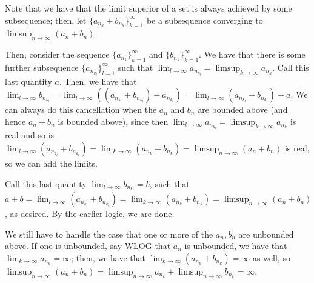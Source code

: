 \documentclass[12pt,letterpaper]{article}
\theoremstyle{definition}
\begin{document}
Note that we have that the limit superior of a set is always achieved by some subsequence; then, let $\{a_{n_{k}} + b_{n_{k}}\}_{k=1}^{\infty}$ be a subsequence converging to $\limsup_{n \rightarrow \infty}(a_{n} + b_{n})$.

Then, consider the sequence $\{a_{n_{k}}\}_{k=1}^{\infty}$ and $\{b_{n_{k}}\}_{k=1}^{\infty}$. We have that there is some further subsequence $\{a_{n_{k_{l}}}\}_{l=1}^{\infty}$ such that $\lim_{l \rightarrow \infty}a_{n_{k_{l}}} = \limsup_{k \rightarrow \infty}a_{n_{k}}$. Call this last quantity $a$. Then, we have that $\lim_{l \rightarrow \infty}b_{n_{k_{l}}} = \lim_{l \rightarrow \infty}((a_{n_{k_{l}}} + b_{n_{k_{l}}}) - a_{n_{k_{l}}}) = \lim_{l \rightarrow \infty}(a_{n_{k_{l}}} + b_{n_{k_{l}}}) - a$. We can always do this cancellation when the $a_{n}$ and $b_{n}$ are bounded above (and hence $a_{n} + b_{n}$ is bounded above), since then $\lim_{l \rightarrow \infty}a_{n_{k_{l}}} = \limsup_{k \rightarrow \infty}a_{n_{k}}$ is real and so is $\lim_{l \rightarrow \infty}(a_{n_{k_{l}}} + b_{n_{k_{l}}}) = \lim_{k \rightarrow \infty}(a_{n_{k}} + b_{n_{k}}) = \limsup_{n \rightarrow \infty}(a_{n} + b_{n})$ is real, so we can add the limits.

Call this last quantity $\lim_{l \rightarrow \infty}b_{n_{k_{l}}} = b$, such that $a + b = \lim_{l \rightarrow \infty}(a_{n_{k_{l}}} + b_{n_{k_{l}}}) = \lim_{k \rightarrow \infty}(a_{n_{k}} + b_{n_{k}}) = \limsup_{n \rightarrow \infty}(a_{n} + b_{n})$, as desired. By the earlier logic, we are done.

We still have to handle the case that one or more of the $a_{n},b_{n}$ are unbounded above. If one is unbounded, say WLOG that $a_n$ is unbounded, we have that $\lim_{k \rightarrow \infty}a_{n_{k}} = \infty$; then, we have that $\lim_{k \rightarrow \infty}(a_{n_{k}} + b_{n_{k}}) = \infty$ as well, so $\limsup_{n \rightarrow \infty}(a_{n} + b_{n}) = \limsup_{n \rightarrow \infty}a_{n_{k}} + \limsup_{n \rightarrow \infty}b_{n_{k}} = \infty$.
\end{document}
